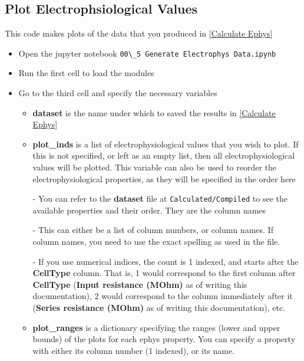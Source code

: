 \documentclass{article}
\begin{document}
\subsection{Plot Electrophsiological Values}

This code makes plots of the data that you produced in \ref{Calculate Ephys}

\begin{itemize}

    \item Open the jupyter notebook \verb|00\_5 Generate Electrophys Data.ipynb|
    
    \item Run the first cell to load the modules
    
    \item Go to the third cell and specify the necessary variables
    \begin{itemize}
        \item \textbf{dataset} is the name under which to saved the results in \ref{Calculate Ephys}
        
        \item \textbf{plot\_inds} is a list of electrophysiological values that you wish to plot. If this is not specified, or left as an empty list, then all electrophysiological values will be plotted. This variable can also be used to reorder the electrophysiological properties, as they will be specified in the order here
        
        - You can refer to the \textbf{dataset} file at \verb|Calculated/Compiled| to see the available properties and their order. They are the column names
        
        - This can either be a list of column numbers, or column names. If column names, you need to use the exact spelling as used in the file.
        
        - If you use numerical indices, the count is 1 indexed, and starts after the \textbf{CellType} column. That is, 1 would correspond to the first column after \textbf{CellType} (\textbf{Input resistance (MOhm)} as of writing this documentation), 2 would correspond to the column immediately after it (\textbf{Series resistance (MOhm)} as of writing this documentation), etc.
        
        \item \textbf{plot\_ranges} is a dictionary specifying the ranges (lower and upper bounds) of the plots for each ephys property. You can specify a property with either its column number (1 indexed), or its name.
        

\end{itemize}
\end{itemize}
\end{document}
